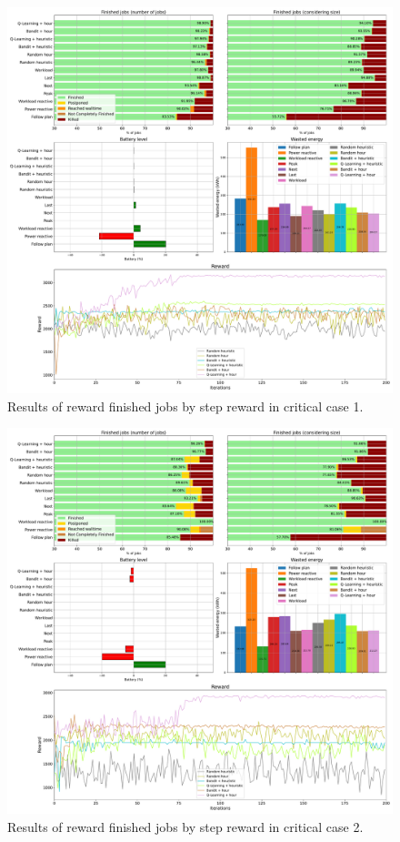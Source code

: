 \begin{figure}[!htb]
    \centering
    \includegraphics[scale=0.29]{Images/Learning_compensations/reward_finished_touched_profile_best_workload_1_with_noise_state_delta.pdf}
    \caption{Results of reward finished jobs by step reward in critical case 1.}
    \label{fig:touched_reward_results_critical_1}
\end{figure}

\begin{figure}[!htb]
    \centering
    \includegraphics[scale=0.29]{Images/Learning_compensations/reward_finished_touched_profile_best_workload_2_with_noise_state_delta.pdf}
    \caption{Results of reward finished jobs by step reward in critical case 2.}
    \label{fig:touched_reward_results_critical_2}
\end{figure}

